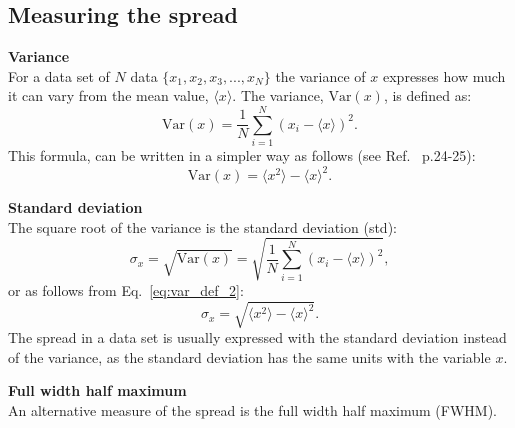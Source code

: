 \subsection{Measuring the spread}\label{app:meas_spread}
\normalsize{\textbf{Variance}}\\
For a data set of $N$ data $\{ x_1, x_2, x_3, ..., x_N \}$ the variance of $x$  expresses how much it can vary from the mean value, $\langle x \rangle$. The variance, $\mathrm{Var}(x)$, is defined as:
\begin{equation}\label{eq:var_def_1}
    \mathrm{Var}(x) = \frac{1}{N} \sum_{i=1}^{N} (x_i-\langle x \rangle)^2.
\end{equation}
This formula, can be written in a simpler way as follows (see Ref.~\cite{lvp.b313005720130101} p.24-25):
\begin{equation}\label{eq:var_def_2}
    \mathrm{Var}(x) = \langle x^2 \rangle - \langle x \rangle^2.
\end{equation}

\normalsize{\textbf{Standard deviation}}\\
The square root of the variance is the standard deviation (std):
\begin{equation}\label{eq:std_def_1}
    \sigma_x = \sqrt{\mathrm{Var}(x)} = \sqrt{\frac{1}{N} \sum_{i=1}^{N} (x_i-\langle x \rangle)^2},
\end{equation}
or as follows from Eq.~\eqref{eq:var_def_2}:
\begin{equation}\label{eq:std_def_2}
    \sigma_x = \sqrt{\langle x^2 \rangle - \langle x \rangle^2}.
\end{equation}
The spread in a data set is usually expressed with the standard deviation instead of the variance, as the standard deviation has the same units with the variable $x$.


\normalsize{\textbf{Full width half maximum}}\\
An alternative measure of the spread is the full width half maximum (FWHM).



